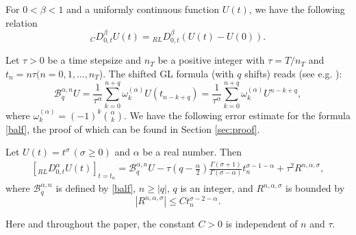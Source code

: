 \documentclass[10pt]{siamltex}
\newcommand{\abs}[1]{\left\vert#1\right\vert}
\begin{document}
For $0<\beta<1$ and a uniformly continuous function $U(t)$, we have
the following relation
\begin{equation}\label{eq:cr}
{}_{C}D_{0,t}^{\beta}{U(t)}={}_{RL}D_{0,t}^{\beta}\left({U(t)}-{U(0)}\right).
\end{equation}
\fi


Let $\tau>0$ be a time stepsize and $n_T$ be a positive integer
with $\tau=T/n_T$ and $t_n=n\tau(n=0,1,...,n_T$).
The shifted GL formula (with $q$ shifts) reads  (see e.g. \cite{MeeTad04}):
\begin{equation}\label{balf}
\mathcal{B}^{\alpha,n}_{q}U
=\frac{1}{\tau^{\alpha}}\sum_{k=0}^{n+q}\omega^{(\alpha)}_{k}U(t_{n-k+q})
=\frac{1}{\tau^{\alpha}}\sum_{k=0}^{n+q}\omega^{(\alpha)}_{k}U^{n-k+q},
\end{equation}
where $\omega^{(\alpha)}_k=(-1)^k\binom{\alpha}{k}$.  We have the following error estimate for the  formula \eqref{balf}, the proof of which  can be found in Section \ref{sec:proof}.
\begin{lemma}\label{lem:quad-accuracy}
Let $U(t)=t^{\sigma}\,(\sigma\geq0)$ and $\alpha$ be  a real number. Then
\begin{equation}\label{SGL}\begin{aligned}
\left[{}_{RL}D^{\alpha}_{0,t}U(t)\right]_{t=t_n}
=\mathcal{B}^{\alpha,n}_{q}U
-\tau\left(q-\frac{\alpha}{2}\right)\frac{\Gamma(\sigma+1)}{\Gamma(\sigma-\alpha)}t_{n}^{\sigma-1-\alpha}
+\tau^{2}R^{n,\alpha,\sigma},
\end{aligned}\end{equation}
where   $\mathcal{B}^{\alpha,n}_{q}$  is defined by \eqref{balf}, $n\geq |q|$, $q$ is an integer, and $R^{n,\alpha,\sigma}$ is bounded by
\begin{equation}\label{Rn}
\abs{R^{n,\alpha,\sigma}}\leq  C t_n^{\sigma-2-\alpha}.
\end{equation}
%
\end{lemma}
Here and throughout the paper,  the constant $C>0$ is independent of $n$ and $\tau$.
\end{document}

